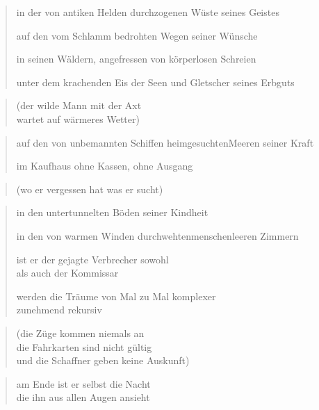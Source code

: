 
{\setlength{\stanzaskip}{0.5em}


\cleartoverso


\begin{verse}
in der von antiken Helden durchzogenen Wüste seines Geistes

auf den vom Schlamm bedrohten Wegen seiner Wünsche

in seinen Wäldern, angefressen von körperlosen Schreien

unter dem krachenden Eis der Seen und Gletscher seines Erbguts
\end{verse}

\begin{quote}
(der wilde Mann mit der Axt\\
wartet auf wärmeres Wetter)
\end{quote}

\begin{verse}
auf den von unbemannten Schiffen heimgesuchten\verselinebreak Meeren seiner Kraft

im Kaufhaus ohne Kassen, ohne Ausgang
\end{verse}

\begin{quote}
(wo er vergessen hat was er sucht)
\end{quote}

\begin{verse}
in den untertunnelten Böden seiner Kindheit

in den von warmen Winden durchwehten\verselinebreak menschenleeren Zimmern

ist er der gejagte Verbrecher sowohl\\
als auch der Kommissar

werden die Träume von Mal zu Mal komplexer\\
zunehmend rekursiv
\end{verse}

\restoregeometry
\clearpage

\begin{quote}
(die Züge kommen niemals an\\
die Fahrkarten sind nicht gültig\\
und die Schaffner geben keine Auskunft)
\end{quote}

\begin{verse}
am Ende ist er selbst die Nacht\\
die ihn aus allen Augen ansieht


\end{verse}}
